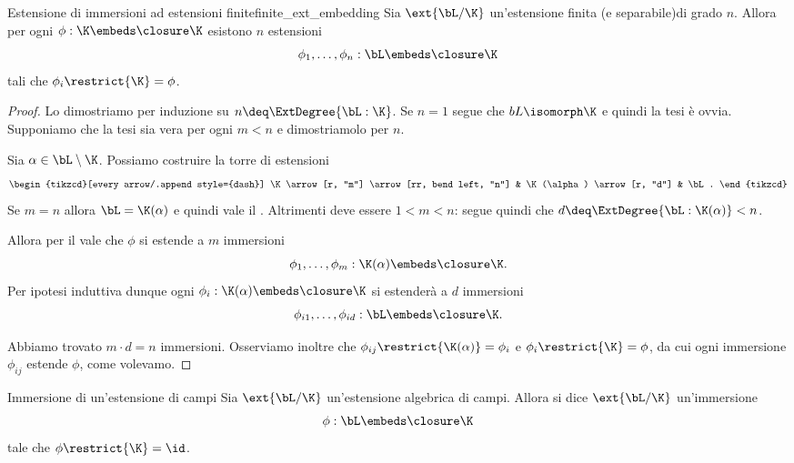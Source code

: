 \begin{theorem}
    {Estensione di immersioni ad estensioni finite}{finite_ext_embedding}
    Sia $\ext{\bL / \K}$ un'estensione finita (e separabile)di grado $n$. Allora per ogni $\phi : \K \embeds \closure\K$ esistono $n$ estensioni \[
        \phi_1, \dots, \phi_n : \bL \embeds \closure\K
    \] tali che $\phi_i\restrict{\K} = \phi$. 
\end{theorem}
\begin{proof}
    Lo dimostriamo per induzione su $n \deq \ExtDegree{\bL : \K}$.
     Se $n = 1$ segue che $bL \isomorph \K$ e quindi la tesi è ovvia.
     Supponiamo che la tesi sia vera per ogni $m < n$ e dimostriamolo per $n$.
    
    Sia $\alpha \in \bL \setminus \K$. Possiamo costruire la torre di estensioni \[
        \begin{tikzcd}[every arrow/.append style={dash}]
            \K \arrow[r, "m"] \arrow[rr, bend left, "n"] &
            \K(\alpha) \arrow[r, "d"] &
            \bL.
        \end{tikzcd}
    \] Se $m = n$ allora $\bL = \K(\alpha)$ e quindi vale il . Altrimenti deve essere $1 < m < n$: segue quindi che $d \deq \ExtDegree{\bL : \K(\alpha)} < n$.
    
    Allora per il  vale che $\phi$ si estende a $m$ immersioni \[
        \phi_1, \dots, \phi_m : \K(\alpha) \embeds \closure\K.
    \] Per ipotesi induttiva dunque ogni $\phi_i : \K(\alpha) \embeds \closure\K$ si estenderà a $d$ immersioni \[
        \phi_{i1}, \dots, \phi_{id} : \bL \embeds \closure\K.
    \]

    Abbiamo trovato $m \cdot d = n$ immersioni. Osserviamo inoltre che $\phi_{ij}\restrict{\K(\alpha)} = \phi_i$ e $\phi_i\restrict{\K} = \phi$, da cui ogni immersione $\phi_{ij}$ estende $\phi$, come volevamo.
\end{proof}

\begin{definition}
    {Immersione di un'estensione di campi}{}
    Sia $\ext{\bL / \K}$ un'estensione algebrica di campi. Allora si dice  $\ext{\bL / \K}$ un'immersione \[
        \phi : \bL \embeds \closure\K
    \] tale che $\phi\restrict{\K} = \id$. 
\end{definition}